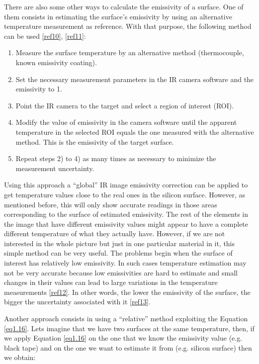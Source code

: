 		There are also some other ways to calculate the emissivity of a surface. One of them consists in estimating the surface’s emissivity by using an alternative temperature measurement as reference. With that purpose, the following method can be used  \ref{ref10}, \ref{ref11}:
		
		\begin{enumerate}[label={\arabic*)}]
			\item Measure the surface temperature by an alternative method (thermocouple, known emissivity coating).
			\item Set the necessary measurement parameters in the IR camera software and the emissivity to 1.
			\item Point the IR camera to the target and select a region of interest (ROI).
			\item Modify the value of emissivity in the camera software until the apparent temperature in the selected ROI equals the one measured with the alternative method. This is the emissivity of the target surface.
			\item Repeat steps 2) to 4) as many times as necessary to minimize the measurement uncertainty.
		\end{enumerate}
	
		Using this approach a “global” IR image emissivity correction can be applied to get temperature values close to the real ones in the silicon surface. However, as mentioned before, this will only show accurate readings in those areas corresponding to the surface of estimated emissivity. The rest of the elements in the image that have different emissivity values might appear to have a complete different temperature of what they actually have. However, if we are not interested in the whole picture but just in one particular material in it, this simple method can be very useful. The problems begin when the surface of interest has relatively low emissivity. In such cases temperature estimation may not be very accurate because low emissivities are hard to estimate and small changes in their values can lead to large variations in the temperature measurements \ref{ref12}. In other words, the lower the emissivity of the surface, the bigger the uncertainty associated with it \ref{ref13}.
		
		Another approach consists in using a “relative” method exploiting the Equation \ref{eq1.16}. Lets imagine that we have two surfaces at the same temperature, then, if we apply Equation \ref{eq1.16} on the one that we know the emissivity value (e.g. black tape) and on the one we want to estimate it from (e.g. silicon surface) then we obtain:
		
